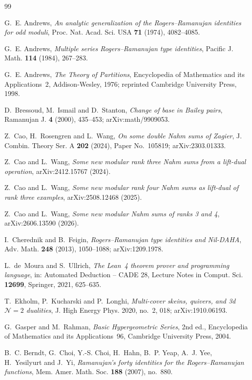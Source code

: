 \documentclass[11pt]{amsart}
\theoremstyle{definition}
\numberwithin{equation}{section}
\begin{document}
\begin{thebibliography}{99}

 G.~E. Andrews, \emph{An analytic generalization of the Rogers--Ramanujan identities
for odd moduli}, Proc. Nat. Acad. Sci. USA \textbf{71} (1974), 4082--4085.

 G.~E. Andrews, \emph{Multiple series Rogers--Ramanujan type identities}, Pacific J.
Math. \textbf{114} (1984), 267--283.

 G.~E. Andrews, \emph{The Theory of Partitions}, Encyclopedia of Mathematics and its
Applications~2, Addison-Wesley, 1976; reprinted Cambridge University Press, 1998.

 D.~Bressoud, M.~Ismail and D.~Stanton, \emph{Change of base in Bailey pairs}, Ramanujan J.
\textbf{4} (2000), 435--453; arXiv:math/9909053.

 Z.~Cao, H.~Rosengren and L.~Wang, \emph{On some double Nahm sums of Zagier}, J. Combin.
Theory Ser. A \textbf{202} (2024), Paper No.~105819; arXiv:2303.01333.

 Z.~Cao and L.~Wang, \emph{Some new modular rank three Nahm sums from a lift-dual
operation}, arXiv:2412.15767 (2024).

 Z.~Cao and L.~Wang, \emph{Some new modular rank four Nahm sums as lift-dual of rank
three examples}, arXiv:2508.12468 (2025).

 Z.~Cao and L.~Wang, \emph{Some new modular Nahm sums of ranks 3 and 4}, arXiv:2606.13590
(2026).

 I.~Cherednik and B.~Feigin, \emph{Rogers--Ramanujan type identities and Nil-DAHA}, Adv.
Math. \textbf{248} (2013), 1050--1088; arXiv:1209.1978.

 L.~de~Moura and S.~Ullrich, \emph{The Lean~4 theorem prover and programming language},
in: Automated Deduction -- CADE 28, Lecture Notes in Comput. Sci. \textbf{12699}, Springer, 2021,
625--635.

 T.~Ekholm, P.~Kucharski and P.~Longhi, \emph{Multi-cover skeins, quivers, and 3d
$\mathcal N=2$ dualities}, J. High Energy Phys. 2020, no.~2, 018; arXiv:1910.06193.

 G.~Gasper and M.~Rahman, \emph{Basic Hypergeometric Series}, 2nd ed., Encyclopedia of
Mathematics and its Applications~96, Cambridge University Press, 2004.

 B.~C. Berndt, G.~Choi, Y.-S. Choi, H.~Hahn, B.~P. Yeap, A.~J. Yee, H.~Yesilyurt and
J.~Yi, \emph{Ramanujan's forty identities for the Rogers--Ramanujan functions}, Mem. Amer. Math. Soc.
\textbf{188} (2007), no.~880.


\end{thebibliography}
\end{document}
